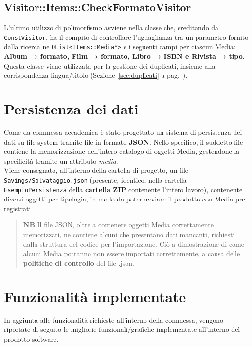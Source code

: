 \documentclass[a4paper,10pt]{article}
\begin{document}
	\subsection{Visitor::Items::CheckFormatoVisitor}
	L'ultimo utilizzo di polimorfismo avviene nella classe che, ereditando da \texttt{ConstVisitor}, ha il compito di controllare l'uguaglianza tra un parametro fornito dalla ricerca ne \texttt{QList<Items::Media*>} e i seguenti campi per ciascun Media: \textbf{Album → formato, Film → formato, Libro → ISBN e Rivista → tipo}. Questa classe viene utilizzata per la gestione dei duplicati, insieme alla corrispondenza lingua/titolo (Sezione~\ref{sec:duplicati} a pag.~\pageref{sec:duplicati}).
	
	\clearpage
	\section{Persistenza dei dati}
	Come da commessa accademica è stato progettato un sistema di persistenza dei dati su file system tramite file in formato \textbf{JSON}. Nello specifico, il suddetto file contiene la memorizzazione dell'intero catalogo di oggetti Media, gestendone la specificità tramite un attributo \textit{media}.\\
	Viene consegnato, all'interno della cartella di progetto, un file \texttt{Savings/Salvataggio.json} (presente, identico, nella cartella \texttt{EsempioPersistenza} della \textbf{cartella ZIP} contenente l'intero lavoro), contenente diversi oggetti per tipologia, in modo da poter avviare il prodotto con Media pre registrati.
	\begin{quote}
		\textbf{NB} Il file JSON, oltre a contenere oggetti Media correttamente memorizzati, ne contiene alcuni che presentano dati mancanti, richiesti dalla struttura del codice per l'importazione. Ciò a dimostrazione di come alcuni Media potranno non essere importati correttamente, a causa delle \textbf{politiche di controllo} del file .json.\\
	\end{quote}
	
	\section{Funzionalità implementate}
	In aggiunta alle funzionalità richieste all'interno della commessa, vengono riportate di seguito le migliorie funzionali/grafiche implementate all'interno del prodotto software.
\end{document}
